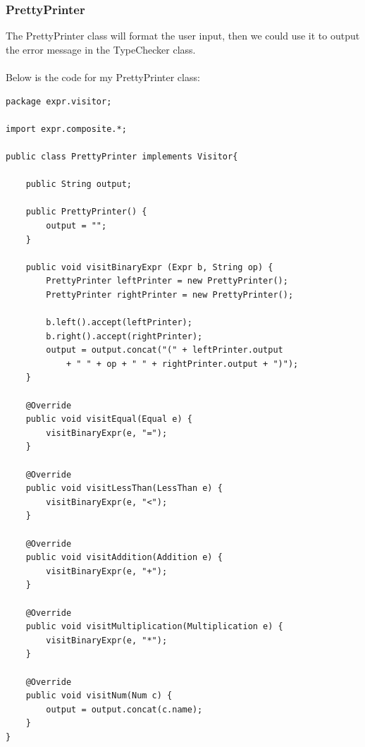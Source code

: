 \documentclass[a4paper,12pt,titlepage]{article}
\begin{document}
\subsubsection{PrettyPrinter}
The {\footnotesize\ttfamily PrettyPrinter} class will format the user input, then we could use it to output the error message in the TypeChecker class.
\\
\\
Below is the code for my  {\footnotesize\ttfamily PrettyPrinter} class:
\begin{lstlisting}
package expr.visitor;

import expr.composite.*;

public class PrettyPrinter implements Visitor{
	
	public String output;
	
	public PrettyPrinter() {
		output = "";
	}
	
	public void visitBinaryExpr (Expr b, String op) {
		PrettyPrinter leftPrinter = new PrettyPrinter();
		PrettyPrinter rightPrinter = new PrettyPrinter();
		
		b.left().accept(leftPrinter);
		b.right().accept(rightPrinter);
		output = output.concat("(" + leftPrinter.output 
			+ " " + op + " " + rightPrinter.output + ")");
	}
	
	@Override
	public void visitEqual(Equal e) {
		visitBinaryExpr(e, "=");
	}

	@Override
	public void visitLessThan(LessThan e) {
		visitBinaryExpr(e, "<");
	}

	@Override
	public void visitAddition(Addition e) {
		visitBinaryExpr(e, "+");
	}

	@Override
	public void visitMultiplication(Multiplication e) {
		visitBinaryExpr(e, "*");
	}
	
	@Override
	public void visitNum(Num c) {
		output = output.concat(c.name);	
	}
}
\end{lstlisting}

\end{document}
